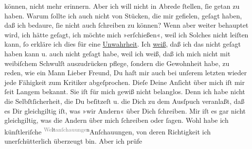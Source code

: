 \begin{ledgroupsized}[t]{13cm}
               können, nicht mehr erinnern. Aber ich will nicht in Abrede ſtellen, ſie getan zu
               haben. {\pb}Warum ſollte ich auch nicht von Stücken, die mir
               gefielen, geſagt haben, daß ich bedaure, ſie nicht auch ſchreiben zu können? Wenn
               aber weiter behauptet wird, ich hätte geſagt, ich möchte mich »erſchießen«, weil ich
               Solches nicht leiſten kann, ſo erkläre ich dies für eine \uline{Unwahrheit}. \strikeout{\textcolor{gray}{×}\-\textcolor{gray}{×}\-\textcolor{gray}{×}\-\textcolor{gray}{×}{ }\textcolor{gray}{Feſtſtellung dieſ}\textcolor{gray}{×}\-\textcolor{gray}{×}{ }\textcolor{gray}{×}\-\textcolor{gray}{×}\-\textcolor{gray}{×}\-\textcolor{gray}{×}\-\textcolor{gray}{×}\-\textcolor{gray}{×}\-\textcolor{gray}{×}} Ich \uline{weiß}, daß ich das nicht geſagt haben kann
               u. auch nicht geſagt habe, weil ich weiß, daß ich mich nicht mit weibiſchem Schwulſt
                  {\pb}auszudrücken pflege, ſondern die Gewohnheit
               habe, zu reden, wie ein Mann{\dotsseven}\pend
           \pstart
           Lieber Freund, Du haſt mir auch bei unſerem letzten \label{K_L03475-17v}\label{K_L03475-17h} wieder jede Fähigkeit zum Kritiker abgeſprochen. Dieſe Deine
               Anſicht über mich iſt mir ſeit Langem bekannt. Sie iſt für mich gewiß nicht
               belanglos. Denn ich habe nicht die Selbſtſicherheit, die Du beſitzeſt u. die Dich zu
               dem Ausſpuch veranlaßt, daß es {\pb}Dir gleichgiltig
               iſt, was  »wir Andern« über Dich ſchreiben. Mir
               iſt es gar nicht gleichgiltig, was die Andern über mich ſchreiben oder ſagen. Wohl
               habe ich künſtleriſche \substVorne{}\textsuperscript{\textcolor{gray}{We}lt\textcolor{gray}{anſchauunge}n}{\allowbreak}\substDazwischen{}Anſchauungen\substHinten{}, von deren Richtigkeit ich unerſchütterlich überzeugt bin. Aber ich prüfe

\end{ledgroupsized}
